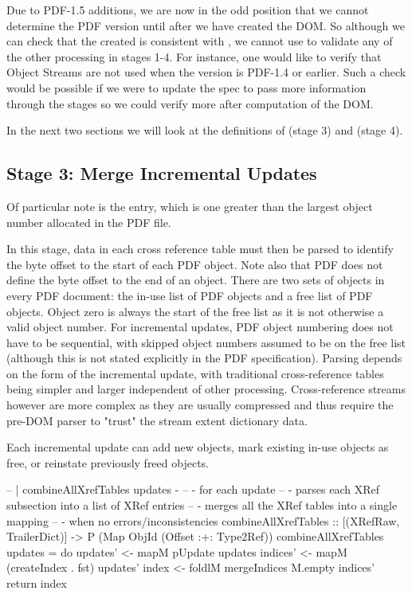 Due to PDF-1.5 additions, we are now in the odd position that we
cannot determine the PDF version until after we have created the DOM.
So although we
can check that the created  is consistent with
,
% 
we cannot use  to validate any of the other processing
in stages 1-4.
%
For instance, one would like to verify that Object Streams are not
used when the version is PDF-1.4 or earlier.
%
Such a check would be possible if we were to update the spec to pass
more information through the stages so we could verify more after
computation of the DOM.

In the next two sections we will look at the definitions of
 (stage 3) and
 (stage 4).

\subsection{Stage 3: Merge Incremental Updates}

Of particular note is the  entry, which
is one greater than the largest object number allocated in the PDF
file.

In this stage, data in each cross reference table must then be parsed to
identify the byte offset to the start of each PDF object. Note also that PDF
does not define the byte offset to the end of an object. There are two sets of
objects in every PDF document: the in-use list of PDF objects and a free list
of PDF objects. Object zero is always the start of the free list as it is not
otherwise a valid object number. For incremental updates, PDF object numbering
does not have to be sequential, with skipped object numbers assumed to be on
the free list (although this is not stated explicitly in the PDF
specification). Parsing depends on the form of the incremental update, with
traditional cross-reference tables being simpler and larger independent of
other processing. Cross-reference streams however are more complex as they are
usually compressed and thus require the pre-DOM parser to "trust" the stream
extent dictionary data.

Each incremental update can add new objects, mark existing in-use objects as
free, or reinstate previously freed objects.

\begin{code}
-- | combineAllXrefTables updates - 
--   - for each update
--     - parses each XRef subsection into a list of XRef entries
--   - merges all the XRef tables into a single mapping
--     - when no errors/inconsistencies
combineAllXrefTables
  :: [(XRefRaw, TrailerDict)] -> P (Map ObjId (Offset :+: Type2Ref))
combineAllXrefTables updates =
  do
  updates' <- mapM pUpdate updates  
  indices' <- mapM (createIndex . fst) updates' 
  index    <- foldlM mergeIndices M.empty indices'
  return index
\end{code}

